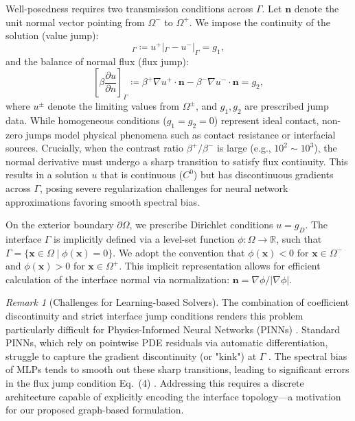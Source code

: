 \documentclass[11pt]{article}
\theoremstyle{definition}
\theoremstyle{remark}
\newtheorem{remark}{Remark}
\theoremstyle{plain}
\begin{document}
Well-posedness requires two transmission conditions across $\Gamma$. Let $\mathbf{n}$ denote the unit normal vector pointing from $\Omega^-$ to $\Omega^+$. We impose the continuity of the solution (value jump):
\begin{equation}
    [u]_\Gamma \coloneqq u^+|_\Gamma - u^-|_\Gamma = g_1,
\end{equation}
and the balance of normal flux (flux jump):
\begin{equation}
    \left[\beta \frac{\partial u}{\partial n}\right]_\Gamma \coloneqq \beta^+ \nabla u^+ \cdot \mathbf{n} - \beta^- \nabla u^- \cdot \mathbf{n} = g_2,
\end{equation}
where $u^\pm$ denote the limiting values from $\Omega^\pm$, and $g_1, g_2$ are prescribed jump data. While homogeneous conditions ($g_1=g_2=0$) represent ideal contact, non-zero jumps model physical phenomena such as contact resistance or interfacial sources. 
Crucially, when the contrast ratio $\beta^+/\beta^-$ is large (e.g., $10^2 \sim 10^3$), the normal derivative must undergo a sharp transition to satisfy flux continuity. This results in a solution $u$ that is continuous ($C^0$) but has discontinuous gradients across $\Gamma$, posing severe regularization challenges for neural network approximations favoring smooth spectral bias.

On the exterior boundary $\partial\Omega$, we prescribe Dirichlet conditions $u = g_D$. The interface $\Gamma$ is implicitly defined via a level-set function $\phi: \Omega \to \mathbb{R}$, such that $\Gamma = \{\mathbf{x} \in \Omega \mid \phi(\mathbf{x}) = 0\}$. We adopt the convention that $\phi(\mathbf{x}) < 0$ for $\mathbf{x} \in \Omega^-$ and $\phi(\mathbf{x}) > 0$ for $\mathbf{x} \in \Omega^+$. This implicit representation allows for efficient calculation of the interface normal via normalization: $\mathbf{n} = \nabla\phi / |\nabla\phi|$.

\begin{remark}[Challenges for Learning-based Solvers]
    The combination of coefficient discontinuity and strict interface jump conditions renders this problem particularly difficult for Physics-Informed Neural Networks (PINNs) \cite{raissi2019physics}. Standard PINNs, which rely on pointwise PDE residuals via automatic differentiation, struggle to capture the gradient discontinuity (or "kink") at $\Gamma$ \cite{jagtap2020conservative, hu2022discontinuity}. The spectral bias of MLPs tends to smooth out these sharp transitions, leading to significant errors in the flux jump condition Eq.~(4) \cite{rahaman2019spectral}. Addressing this requires a discrete architecture capable of explicitly encoding the interface topology—a motivation for our proposed graph-based formulation.
\end{remark}
\end{document}
